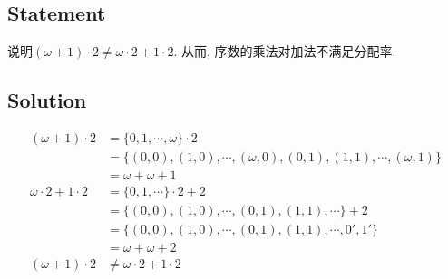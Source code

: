 \documentclass[UTF-8]{ctexart}
\begin{document}
\subsection{Statement}
说明$(\omega + 1) \cdot 2 \neq \omega \cdot 2 + 1 \cdot 2$. 从而, 序数的乘法对加法不满足分配率.
\subsection{Solution}
\begin{align*}
(\omega + 1) \cdot 2 &= \{0, 1, \cdots, \omega\} \cdot 2 \\&= \{(0, 0), (1, 0), \cdots, (\omega, 0), (0, 1), (1, 1), \cdots, (\omega, 1)\} \\ &= \omega + \omega + 1\\
\omega \cdot 2 + 1 \cdot 2 &= \{0, 1, \cdots\} \cdot 2 + 2\\&=\{(0, 0), (1, 0), \cdots, (0, 1), (1, 1), \cdots\} + 2\\&=\{(0, 0), (1, 0), \cdots, (0, 1), (1, 1), \cdots, 0', 1'\}\\&= \omega + \omega + 2\\
(\omega + 1) \cdot 2 &\neq \omega \cdot 2 + 1 \cdot 2
\end{align*}
\end{document}
